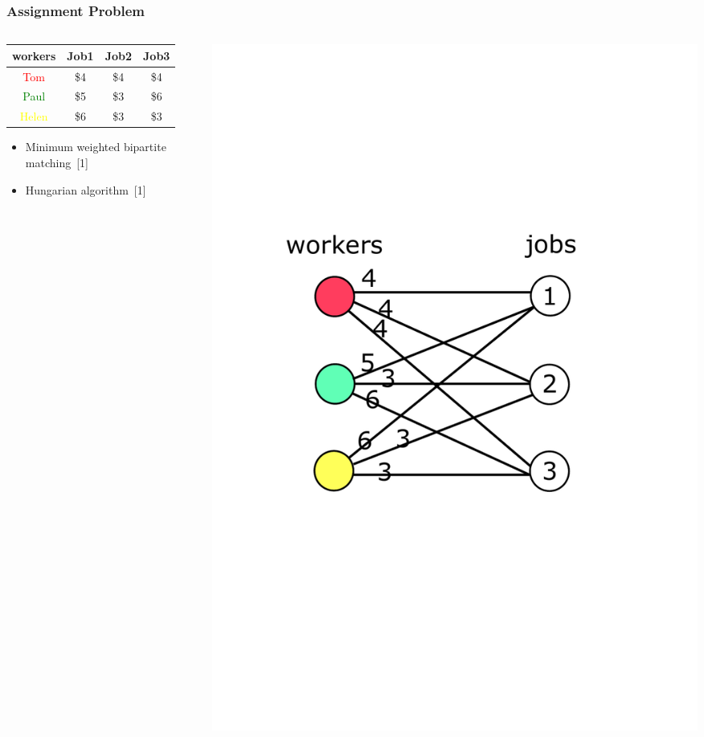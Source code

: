 \documentclass[titlepage,german,presentation]{beamer}
\begin{document}
\begin{frame}
\frametitle{Assignment Problem}

    \begin{columns}
    \begin{column}{.5\textwidth}
\begin{table}[!ht]
\small
   \begin{tabular}{|c|c|c|c|} \hline
     workers& Job1 & Job2 & Job3 \\ \hline
     \textcolor{red}{Tom} & \$4  & \$4   & \$4  \\ \hline
     \textcolor{green}{Paul} & \$5 & \$3 & \$6\\  \hline
     \textcolor{yellow}{Helen} &  \$6 & \$3 & \$3 \\ \hline
     \end{tabular}
\end{table} 
\begin{itemize}
\item Minimum weighted bipartite matching~[1]
\medskip
\item Hungarian algorithm~[1]
\end{itemize}
        \end{column}
        \begin{column}{.5\textwidth}
        \centering
\includegraphics[height=\textheight]{assignment.pdf}
        \end{column}
        \end{columns}


\end{frame}
\end{document}
